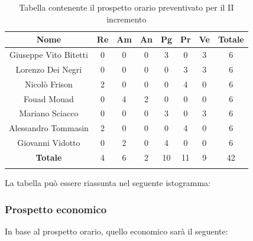 			\begin{longtable}{|c|c|c|c|c|c|c|c}
				\hline
				\rowcolor{lighter-grayer}
				\textbf{Nome} & \textbf{Re} & \textbf{Am} & \textbf{An} & \textbf{Pg}  & \textbf{Pr}   & \textbf{Ve} & \textbf{Totale} \\
				\hline
				\endfirsthead
				\hline
				Giuseppe Vito Bitetti & 0 & 0 & 0 & 3 & 0 & 3 & 6\\
				\hline
				\hline
				Lorenzo Dei Negri & 0 & 0 & 0 & 0 & 3 & 3 & 6 \\
				\hline
				\hline
				Nicolò Frison & 2 & 0 & 0 & 0 & 4 & 0 & 6 \\
				\hline
				\hline
				Fouad Mouad & 0 & 4 & 2 & 0 & 0 & 0 & 6 \\
				\hline
				\hline
				Mariano Sciacco & 0 & 0 & 0 & 3 & 0 & 3 & 6 \\
				\hline
				\hline
				Alessandro Tommasin & 2 & 0 & 0 & 0 & 4 & 0 & 6 \\
				\hline
				\hline
				Giovanni Vidotto & 0 & 2 & 0 & 4 & 0 & 0 & 6\\
				\hline 
				\textbf{Totale} & 4 &  6 & 2 & 10 & 11 & 9 & 42\\
				\hline 
				
				\caption{Tabella contenente il prospetto orario preventivato per il II incremento}
			\end{longtable}
			\pagebreak	
			
			La tabella può essere riassunta nel seguente istogramma:
			
			
		\subsubsection{Prospetto economico}
			In base al prospetto orario, quello economico sarà il seguente: 
			
